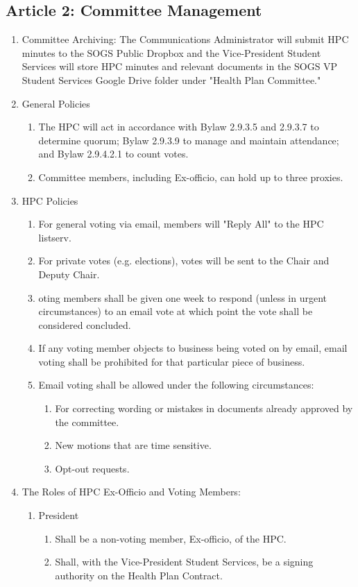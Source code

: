 \subsection{Article 2: Committee Management}
\begin{enumerate} [label*=\arabic*., align=left]	
\item Committee Archiving: The Communications Administrator will submit HPC minutes to the SOGS Public
Dropbox and the Vice-President Student Services will store HPC minutes and relevant documents in the SOGS VP Student Services Google Drive folder under "Health Plan Committee."
\item General Policies
\begin{enumerate} [label*=\arabic*., align=left]	
\item The HPC will act in accordance with Bylaw 2.9.3.5 and 2.9.3.7 to determine quorum; Bylaw 2.9.3.9 to manage and maintain attendance; and Bylaw 2.9.4.2.1 to count votes.
\item Committee members, including Ex-officio, can hold up to three proxies.
\end{enumerate}
\item HPC Policies
\begin{enumerate} [label*=\arabic*., align=left]	
\item For general voting via email, members will "Reply All" to the HPC listserv.
\item For private votes (e.g. elections), votes will be sent to the Chair and Deputy Chair.
\item oting members shall be given one week to respond (unless in urgent circumstances) to
an email vote at which point the vote shall be considered concluded.
\item If any voting member objects to business being voted on by email, email voting shall be
prohibited for that particular piece of business.
\item Email voting shall be allowed under the following circumstances:
\begin{enumerate} [align=left]	
\item For correcting wording or mistakes in documents already approved by the committee. 
\item New motions that are time sensitive.
\item Opt-out requests.
\end{enumerate}
\end{enumerate}
\item The Roles of HPC Ex-Officio and Voting Members:
\begin{enumerate} [label*=\arabic*., align=left]	
\item President
\begin{enumerate}
\item Shall be a non-voting member, Ex-officio, of the HPC.
\item Shall, with the Vice-President Student Services, be a signing authority on the Health Plan Contract.
\end{enumerate}


\end{enumerate}
\end{enumerate}
